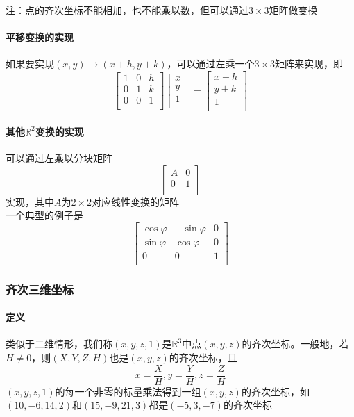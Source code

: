 \documentclass{article}
\begin{document}
\begin{CJK}{UTF8}{gkai}
注：点的齐次坐标不能相加，也不能乘以数，但可以通过$3\times 3$矩阵做变换\\

\paragraph{平移变换的实现\\}
如果要实现$(x,y)\to (x+h,y+k)$，可以通过左乘一个$3\times 3$矩阵来实现，即
\[\begin{bmatrix}
    1&0&h\\
    0&1&k\\
    0&0&1\\
\end{bmatrix}
\begin{bmatrix}
x\\
y\\
1\\
\end{bmatrix}
=
\begin{bmatrix}
    x+h\\
    y+k\\
    1\\
\end{bmatrix}
\]
\paragraph{其他$\mathbb{R}^2$变换的实现\\}
可以通过左乘以分块矩阵
\[\begin{bmatrix}
    A&0\\
    0&1\\
\end{bmatrix}\]
实现，其中$A$为$2\times 2$对应线性变换的矩阵\\
一个典型的例子是
\[\begin{bmatrix}
    \cos \varphi& -\sin \varphi&0\\
    \sin \varphi&\cos \varphi&0\\
    0&0&1\\
\end{bmatrix}\]

\subsubsection{齐次三维坐标}
\paragraph{定义\\}
类似于二维情形，我们称$(x,y,z,1)$是$\mathbb{R}^3$中点$(x,y,z)$的齐次坐标。一般地，若$H\neq 0$，则$(X,Y,Z,H)$也是$(x,y,z)$的齐次坐标，且
\[x=\dfrac{X}{H},y=\dfrac{Y}{H},z=\dfrac{Z}{H}\]
$(x,y,z,1)$的每一个非零的标量乘法得到一组$(x,y,z)$的齐次坐标，如$(10,-6,14,2)$和$(15,-9,21,3)$都是$(-5,3,-7)$的齐次坐标\\


\end{CJK}
\end{document}
